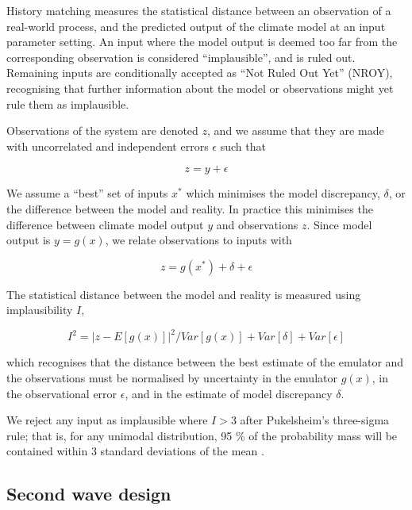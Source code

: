 \documentclass[gmd, manuscript]{copernicus}
\begin{document}
History matching measures the statistical distance between an observation of a real-world process, and the predicted output of the climate model at an input parameter setting. An input where the model output is deemed too far from the corresponding observation is considered ``implausible'', and is ruled out. Remaining inputs are conditionally accepted as ``Not Ruled Out Yet'' (NROY), recognising that further information about the model or observations might yet rule them as implausible.

Observations of the system are denoted $z$, and we assume that they are made with uncorrelated and independent errors $\epsilon$  such that

\begin{equation}
z = y+\epsilon
\end{equation}

We assume a ``best'' set of inputs $x^*$ which minimises the model discrepancy, $\delta$, or the difference between the model and reality. In practice this minimises the difference between climate model output $y$ and observations $z$. Since model output is $y = g(x)$, we relate observations to inputs with 

\begin{equation}
z = g(x^*) + \delta + \epsilon 
\end{equation}

The statistical distance between the model and reality is measured using  implausibility $I$,

\begin{equation}
I^{2} = {\lvert  z - E[g(x)]\rvert}^{2} /  Var[g(x)] + Var[\delta] +  Var[\epsilon]
\end{equation}

which recognises that the distance between the best estimate of the emulator and the observations must be normalised by uncertainty in the emulator $g(x)$, in the observational error $\epsilon$, and in the estimate of model discrepancy $\delta$. 

We reject any input as implausible where $I >3$ after Pukelsheim's three-sigma rule; that is, for any unimodal distribution, 95 \% of the probability mass will be contained within 3 standard deviations of the mean \citep{pukelsheim1994three}.

\subsection{Second wave design}\label{ssec:second_wave_design}
\end{document}
